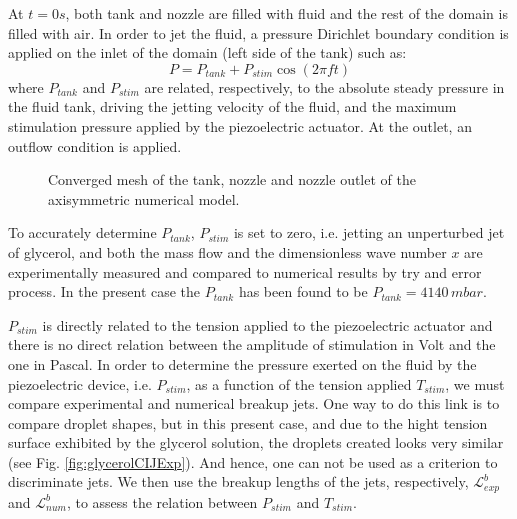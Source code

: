 \documentclass[onecolumn, 12pt]{asme2ej}
\begin{document}
At $t=0s$, both tank and nozzle are filled with fluid and the rest of the domain is filled with air. In order to jet the fluid, a pressure Dirichlet boundary condition is applied on the inlet of the domain (left side of the tank) such as:
\begin{equation} \label{eq:plim}
    P=P_{tank}+P_{stim}\cos(2\pi f t)
\end{equation}
where $P_{tank}$ and $P_{stim}$ are related, respectively, to the absolute steady pressure in the fluid tank, driving the jetting velocity of the fluid, and the maximum stimulation pressure applied by the piezoelectric actuator. At the outlet, an outflow condition is applied.
\begin{figure}[H]
    \centering    
    \caption{Converged mesh of the tank, nozzle and nozzle outlet of the axisymmetric numerical model.} 
    \label{fig:meshGlycerol}
\end{figure}

To accurately determine $P_{tank}$, $P_{stim}$ is set to zero, i.e. jetting an unperturbed jet of glycerol, and both the mass flow and the dimensionless wave number $x$ are experimentally measured and compared to numerical results by try and error process. In the present case the $P_{tank}$ has been found to be $P_{tank}=4140 \, mbar$. 


$P_{stim}$ is directly related to the tension applied to the piezoelectric actuator and there is no direct relation between the amplitude of stimulation in Volt and the one in Pascal. In order to determine the pressure exerted on the fluid by the piezoelectric device, i.e. $P_{stim}$, as a function of the tension applied $T_{stim}$, we must compare experimental and numerical breakup jets. One way to do this link is to compare droplet shapes, but in this present case, and due to the hight tension surface exhibited by the glycerol solution, the droplets created looks very similar (see Fig. \ref{fig:glycerolCIJExp}). And hence, one can not be used as a criterion to discriminate jets. We then use the breakup lengths of the jets, respectively, $\mathcal{L}_{exp}^b$ and $\mathcal{L}_{num}^b$, to assess the relation between $P_{stim}$ and $T_{stim}$. 
\end{document}
